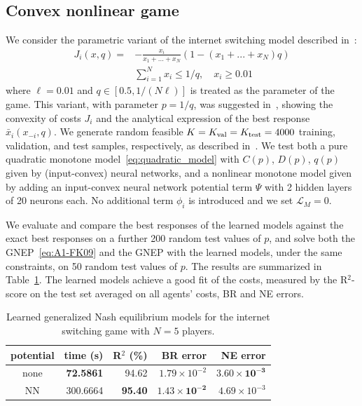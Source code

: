 \documentclass[11pt, a4paper]{article}
\renewcommand{\arraystretch}{1.3}
\newcommand{\LL}{\mathcal{L}}
\theoremstyle{remark}
\theoremstyle{plain}
\begin{document}
\subsection{Convex nonlinear game}
We consider the parametric variant of the internet switching model described in~\cite[Ex. A.1]{FK09}:
\begin{equation}
    \begin{aligned}
    J_i(x,q) = &-\frac{x_i}{x_1+...+x_N}(1-(x_1+...+x_N)q)\\
            &\sum_{i=1}^Nx_i\leq 1/q,\quad  x_i \geq 0.01
    \end{aligned}
\label{eq:A1-FK09}
\end{equation}
where $\ell=0.01$ and $q\in[0.5,1/(N\ell)]$ is treated as the parameter of the game.
This variant, with parameter $p=1/q$, was suggested in~\cite{BT26}, showing the convexity of costs $J_i$ and 
the analytical expression of the best response $\bar x_i(x_{-i},q)$. We generate random feasible
$K=K_{\rm val}=K_{\rm test}=4000$ training, validation, and test samples, respectively,
as described in~\cite{BT26}. We test both a pure quadratic monotone model~\eqref{eq:quadratic_model} with $C(p)$, $D(p)$, $q(p)$ given by (input-convex) neural networks, and a nonlinear monotone model given by adding an input-convex neural network potential term $\Psi$
with 2 hidden layers of 20 neurons each. No additional term $\phi_i$ is introduced and we set $\LL_M=0$. 

We evaluate and compare the best responses of the learned models against the exact best responses on a further 200 random test values of $p$, and solve both the GNEP~\eqref{eq:A1-FK09} and the GNEP with the learned models, under the same constraints, on 50 random test values of $p$. The results are summarized in Table~\ref{tab:nl_internet_game}. The learned models achieve a good fit of the costs, measured by the R$^2$-score on the test set averaged on all agents' costs, BR and NE errors.

\begin{table}[t]
  \centering
  \setlength{\tabcolsep}{4.5pt}
  \renewcommand{\arraystretch}{1.} %
    \begin{tabular}{c|rrrr}
  \hline
  potential & time (s) & R$^2$ (\%) & BR error & NE error \\
  \hline
  none & \textbf{72.5861} & 94.62 & $1.79 \times 10^{-2}$ & $\mathbf{3.60 \times 10^{-3}}$ \\
  NN & 300.6664 & \textbf{95.40} & $\mathbf{1.43 \times 10^{-2}}$ & $4.69 \times 10^{-3}$ \\
  \hline
  \end{tabular}
  \caption{Learned generalized Nash equilibrium models for the internet switching game with $N=5$ players.}
  \label{tab:nl_internet_game}
\end{table}
\end{document}
